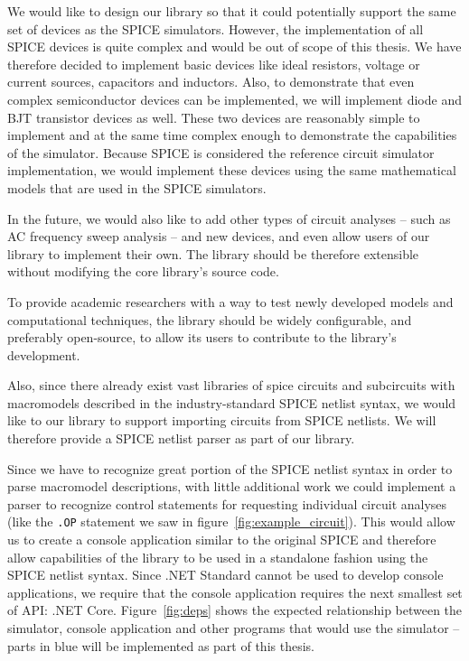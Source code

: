 We would like to design our library so that it could potentially support the same set of devices as the SPICE simulators. However, the implementation of all SPICE devices is quite complex and would be out of scope of this thesis. We have therefore decided to implement basic devices like ideal resistors, voltage or current sources, capacitors and inductors. Also, to demonstrate that even complex semiconductor devices can be implemented, we will implement diode and BJT transistor devices as well. These two devices are reasonably simple to implement and at the same time complex enough to demonstrate the capabilities of the simulator. Because SPICE is considered the reference circuit simulator implementation, we would implement these devices using the same mathematical models that are used in the SPICE simulators.

In the future, we would also like to add other types of circuit analyses -- such as AC frequency sweep analysis -- and new devices, and even allow users of our library to implement their own. The library should be therefore extensible without modifying the core library's source code. 

To provide academic researchers with a way to test newly developed models and computational techniques, the library should be widely configurable, and preferably open-source, to allow its users to contribute to the library's development.

Also, since there already exist vast libraries of spice circuits and subcircuits with macromodels described in the industry-standard SPICE netlist syntax, we would like to our library to support importing circuits from SPICE netlists. We will therefore provide a SPICE netlist parser as part of our library.

Since we have to recognize great portion of the SPICE netlist syntax in order to parse macromodel descriptions, with little additional work we could implement a parser to recognize control statements for requesting individual circuit analyses (like the \texttt{.OP} statement we saw in figure~\ref{fig:example_circuit}). This would allow us to create a console application similar to the original SPICE and therefore allow capabilities of the library to be used in a standalone fashion using the SPICE netlist syntax. Since .NET Standard cannot be used to develop console applications, we require that the console application requires the next smallest set of API: .NET Core. Figure~\ref{fig:deps} shows the expected relationship between the simulator, console application and other programs that would use the simulator -- parts in blue will be implemented as part of this thesis.

